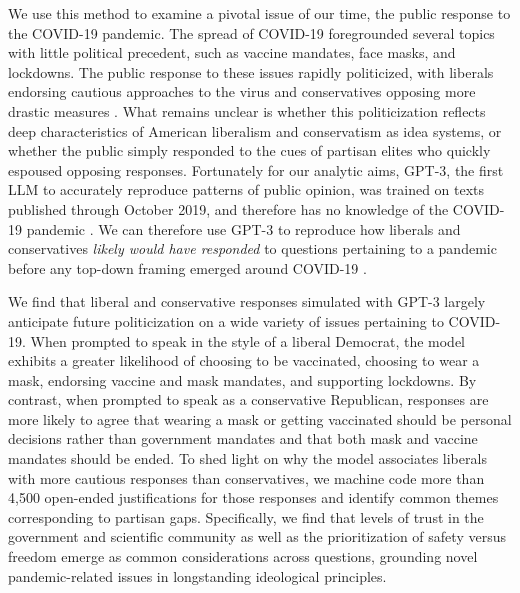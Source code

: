 \documentclass{article}
\begin{document}
We use this method to examine a pivotal issue of our time, the public
response to the COVID-19 pandemic. The spread of COVID-19 foregrounded
several topics with little political precedent, such as vaccine
mandates, face masks, and lockdowns. The public response to these issues
rapidly politicized, with liberals endorsing cautious approaches to the
virus and conservatives opposing more drastic measures
\parencite{Gadarian2021-su}. What remains unclear is whether this politicization
reflects deep characteristics of American liberalism and conservatism as
idea systems, or whether the public simply responded to the cues of
partisan elites who quickly espoused opposing responses. Fortunately for
our analytic aims, GPT-3, the first LLM to accurately reproduce patterns
of public opinion, was trained on texts published through October 2019,
and therefore has no knowledge of the COVID-19 pandemic
\parencite{OpenAI2023-wo}. We can
therefore use GPT-3 to reproduce how liberals and conservatives
\emph{likely would have responded} to questions pertaining to a pandemic
before any top-down framing emerged around COVID-19
\parencite{Kaplan2008-nm}.

We find that liberal and conservative responses simulated with GPT-3
largely anticipate future politicization on a wide variety of issues
pertaining to COVID-19. When prompted to speak in the style of a liberal
Democrat, the model exhibits a greater likelihood of choosing to be
vaccinated, choosing to wear a mask, endorsing vaccine and mask
mandates, and supporting lockdowns. By contrast, when prompted to speak
as a conservative Republican, responses are more likely to agree that
wearing a mask or getting vaccinated should be personal decisions rather
than government mandates and that both mask and vaccine mandates should
be ended. To shed light on why the model associates liberals with more
cautious responses than conservatives, we machine code more than 4,500
open-ended justifications for those responses and identify common themes
corresponding to partisan gaps. Specifically, we find that levels of
trust in the government and scientific community as well as the
prioritization of safety versus freedom emerge as common considerations
across questions, grounding novel pandemic-related issues in
longstanding ideological principles.
\end{document}
